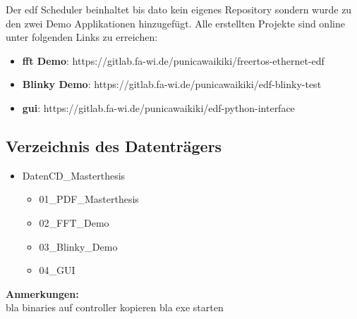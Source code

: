 \documentclass[../EDF Master Thesis.tex]{subfiles}
\begin{document}
Der \ac{edf} Scheduler beinhaltet bis dato kein eigenes Repository sondern wurde zu den zwei Demo Applikationen hinzugefügt.
Alle erstellten Projekte sind online unter folgenden Links zu erreichen:

\begin{itemize}
    \item \textbf{\ac{fft} Demo}: https://gitlab.fa-wi.de/punicawaikiki/freertos-ethernet-edf
    \item \textbf{Blinky Demo}: https://gitlab.fa-wi.de/punicawaikiki/edf-blinky-test
    \item \textbf{\ac{gui}}: https://gitlab.fa-wi.de/punicawaikiki/edf-python-interface
\end{itemize}

\subsection{Verzeichnis des Datenträgers}

\begin{itemize}
    \item Daten\-CD\_Masterthesis
    \begin{itemize}
        \item 01\_PDF\_Masterthesis
        \item 02\_FFT\_Demo
        \item 03\_Blinky\_Demo
        \item 04\_GUI
    \end{itemize}
\end{itemize}

\textbf{Anmerkungen:}\\
bla binaries auf controller kopieren
bla exe starten
\end{document}
